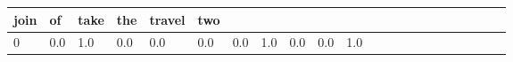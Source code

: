 \documentclass[
  brazilian,
]{article}
\begin{document}
\begin{longtable}[]{@{}llllllllllllllllllllll@{}}
\begin{minipage}[b]{0.02\columnwidth}
join\strut
\end{minipage} & \begin{minipage}[b]{0.02\columnwidth}\raggedright
of\strut
\end{minipage} & \begin{minipage}[b]{0.02\columnwidth}\raggedright
take\strut
\end{minipage} & \begin{minipage}[b]{0.02\columnwidth}\raggedright
the\strut
\end{minipage} & \begin{minipage}[b]{0.03\columnwidth}\raggedright
travel\strut
\end{minipage} & \begin{minipage}[b]{0.02\columnwidth}\raggedright
two\strut
\end{minipage}\tabularnewline
\midrule
\endhead
\begin{minipage}[t]{0.01\columnwidth}\raggedright
0\strut
\end{minipage} & \begin{minipage}[t]{0.03\columnwidth}\raggedright
0.0\strut
\end{minipage} & \begin{minipage}[t]{0.04\columnwidth}\raggedright
1.0\strut
\end{minipage} & \begin{minipage}[t]{0.03\columnwidth}\raggedright
0.0\strut
\end{minipage} & \begin{minipage}[t]{0.02\columnwidth}\raggedright
0.0\strut
\end{minipage} & \begin{minipage}[t]{0.02\columnwidth}\raggedright
0.0\strut
\end{minipage} & \begin{minipage}[t]{0.02\columnwidth}\raggedright
0.0\strut
\end{minipage} & \begin{minipage}[t]{0.02\columnwidth}\raggedright
1.0\strut
\end{minipage} & \begin{minipage}[t]{0.03\columnwidth}\raggedright
0.0\strut
\end{minipage} & \begin{minipage}[t]{0.02\columnwidth}\raggedright
0.0\strut
\end{minipage} & \begin{minipage}[t]{0.03\columnwidth}\raggedright
1.0\strut
\end{minipage} & \begin{minipage}[t]{0.02\columnwidth}\raggedright

\end{minipage}
\end{longtable}
\end{document}
